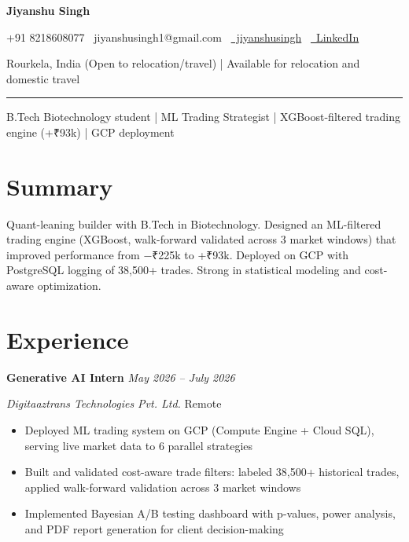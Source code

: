 \documentclass[11pt,a4paper]{article}
\begin{document}
\begin{center}
    {\LARGE \bfseries Jiyanshu Singh}
    
    \vspace{4pt}
    {\small +91 8218608077 \textbullet\ jiyanshusingh1@gmail.com \textbullet\ \href{https://github.com/jiyanshusingh}{\faGithub\ jiyanshusingh} \textbullet\ \href{https://linkedin.com/in/jiyanshusingh}{\faLinkedin\ LinkedIn}}
    
    \vspace{2pt}
    {\footnotesize Rourkela, India (Open to relocation/travel) | Available for relocation and domestic travel}
    
    \rule{\textwidth}{0.4pt}
\end{center}

\begin{center}
    {\large \color{midblue} B.Tech Biotechnology student | ML Trading Strategist | XGBoost-filtered trading engine (+₹93k) | GCP deployment}
\end{center}

\vspace{6pt}
\section*{Summary}
Quant-leaning builder with B.Tech in Biotechnology. Designed an ML-filtered trading engine (XGBoost, walk-forward validated across 3 market windows) that improved performance from −₹225k to +₹93k. Deployed on GCP with PostgreSQL logging of 38,500+ trades. Strong in statistical modeling and cost-aware optimization.

\section*{Experience}
\noindent\textbf{Generative AI Intern} \hfill \textit{May 2026 – July 2026}

\noindent\textit{Digitaaztrans Technologies Pvt. Ltd.} \hfill Remote
\begin{itemize}
    \item Deployed ML trading system on GCP (Compute Engine + Cloud SQL), serving live market data to 6 parallel strategies
    \item Built and validated cost-aware trade filters: labeled 38,500+ historical trades, applied walk-forward validation across 3 market windows
    \item Implemented Bayesian A/B testing dashboard with p-values, power analysis, and PDF report generation for client decision-making
\end{itemize}
\end{document}
